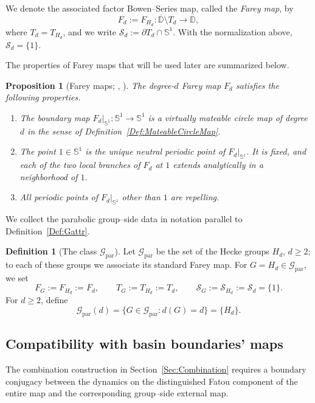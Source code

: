 \documentclass[11pt,a4paper, oneside]{amsart}
\newtheorem{prop}[thm]{Proposition}
\theoremstyle{definition}
\newtheorem{defn}[thm]{Definition}
\theoremstyle{remark}
\numberwithin{equation}{section}
\def\D{{\mathbb{D}}}
\def\Ss{\mathcal{S}}
\renewcommand{\ge}{\geqslant}
\newcommand{\parab}{{\text{par}}}
\newcommand{\Circle}{{{\mathbb S}^1}}
\begin{document}
We denote the associated factor Bowen--Series map, called the \emph{Farey map},
by
\[
F_d:=F_{H_d}:\overline{\D}\setminus T_d\to\overline{\D},
\]
where $T_d = T_{H_d}$, and we write $\Ss_d:=\partial T_d\cap\Circle$.  With the normalization above, $\Ss_d=\{1\}$.

The properties of Farey maps that will be used later are summarized below.

\begin{prop}[Farey maps; {\cite[\S2.4]{MM}, \cite[\S4.2.3, \S5.1.2]{BLLM}}]
	\label{Prop:FareyProperties}
	The degree-$d$ Farey map $F_d$ satisfies the following properties.
	\begin{enumerate}
		\item The boundary map $F_d|_{\Circle}:\Circle\to\Circle$ is a virtually mateable
		circle map of degree $d$ in the sense of Definition~\ref{Def:MateableCircleMap}.  
        
		\item The point $1\in\Circle$ is the unique neutral periodic point of
		$F_d|_{\Circle}$.  It is fixed, and each of the two local branches of $F_d$ at $1$ extends analytically in a neighborhood of $1$.
        
		
		\item All periodic points of $F_d|_{\Circle}$ other than $1$ are repelling.
	\end{enumerate}
\end{prop}

We collect the parabolic group--side data in notation parallel to
Definition~\ref{Def:Gattr}.

\begin{defn}[The class $\mathscr G_{\parab}$]
	\label{Def:Gparab}
	Let $\mathscr G_{\parab}$ be the set of the Hecke groups
	$H_d$, $d\ge2$; to each of these groups we associate its standard Farey map.  For
	$G=H_d\in\mathscr G_{\parab}$, we set
	\[
	F_G:=F_{H_d}:=F_d,
	\qquad
	T_G:=T_{H_d}:=T_d,
	\qquad
	\Ss_G:=\Ss_{H_d}:=\Ss_d=\{1\}.
	\]
	For $d\ge2$, define
	\[
	\mathscr G_{\parab}(d)
	=
	\{G\in\mathscr G_{\parab}:d(G)=d\}
	=
	\{H_d\}.
	\]
\end{defn}

\subsection{Compatibility with basin boundaries' maps}
\label{SSec:BoundaryCompatibility}

The combination construction in Section~\ref{Sec:Combination} requires a
boundary conjugacy between the dynamics on the distinguished Fatou component of
the entire map and the corresponding group--side external map.
\end{document}
